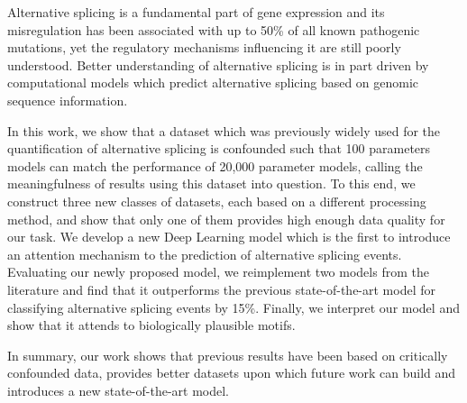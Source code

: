 
Alternative splicing is a fundamental part of gene expression and its misregulation has been associated with up to 50\% of all known pathogenic mutations, yet the regulatory mechanisms influencing it are still poorly understood. Better understanding of alternative splicing is in part driven by computational models which predict alternative splicing based on genomic sequence information. 

In this work, we show that a dataset which was previously widely used for the quantification of alternative splicing is confounded such that 100 parameters models can match the performance of 20,000 parameter models, calling the meaningfulness of results using this dataset into question. To this end, we construct three new classes of datasets, each based on a different processing method, and show that only one of them provides high enough data quality for our task. We develop a new Deep Learning model which is the first to introduce an attention mechanism to the prediction of alternative splicing events. Evaluating our newly proposed model, we reimplement two models from the literature and find that it outperforms the previous state-of-the-art model for classifying alternative splicing events by 15\%. Finally, we interpret our model and show that it attends to biologically plausible motifs. 

In summary, our work shows that previous results have been based on critically confounded data,
provides better datasets upon which future work can build and introduces a new state-of-the-art model. 

